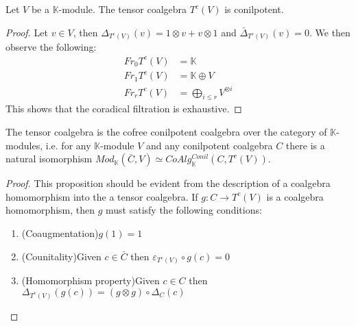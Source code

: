 \documentclass[../../thesis.tex]{subfiles}
\begin{document}

            \begin{proposition}
                Let $V$ be a $\mathbb{K}$-module. The tensor coalgebra $T^c(V)$ is conilpotent.

            \begin{proof}
                Let $v\in V$, then $\Delta_{T^c(V)}(v)=1\otimes v + v\otimes 1$ and $\bar{\Delta}_{T^c(V)}(v)=0$. We then observe the following:
                \begin{align*}
                    Fr_0T^c(V) & = \mathbb{K} \\
                    Fr_1T^c(V) & = \mathbb{K} \oplus V \\
                    Fr_rT^c(V) & = \bigoplus_{i\leq r} V^{\otimes i}
                \end{align*}
                This shows that the coradical filtration is exhaustive.
            \end{proof}

            \begin{proposition}
                The tensor coalgebra is the cofree conilpotent coalgebra over the category of $\mathbb{K}$-modules, i.e. for any $\mathbb{K}$-module $V$ and any conilpotent coalgebra $C$ there is a natural isomorphism $Mod_{\mathbb{K}}(\bar{C}, V)\simeq CoAlg^{Conil}_{\mathbb{K}}(C, T^c(V))$.
            \end{proposition}

            \begin{proof}
                This proposition should be evident from the description of a coalgebra homomorphism into the a tensor coalgebra. If $g:C\rightarrow T^c(V)$ is a coalgebra homomorphism, then $g$ must satisfy the following conditions:
                \begin{enumerate}
                    \item (Coaugmentation)\quad $g(1)=1$
                    \item (Counitality)\quad Given $c\in \bar{C}$ then $\varepsilon_{T^c(V)}\circ g(c)=0$
                    \item (Homomorphism property)\quad Given $c\in C$ then $\Delta_{T^c(V)}(g(c))=(g\otimes g)\circ\Delta_C(c)$
                \end{enumerate}


\end{proof}
\end{proposition}
\end{document}
